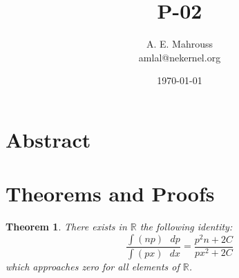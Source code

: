 \documentclass[10pt, twocolumn]{article}
\title{P-02}
\author{A. E. Mahrouss\\amlal@nekernel.org}
\date{\today}
\theoremstyle{plain}
\newtheorem{theorem}{Theorem}[section]
\theoremstyle{definition}
\theoremstyle{remark}
\begin{document}
\maketitle

\section{Abstract}

\section{Theorems and Proofs}
\begin{theorem}
    There exists in $\mathbb{R}$ the following identity:
    \begin{equation}
        \frac{\int (np) \text{ } dp}{\int (px) \text{ } dx} = \frac{p^2n+2C}{px^2+2C}
    \end{equation}
    which approaches zero for all elements of $\mathbb{R}$.
\end{theorem}

\nocite{*}



\end{document}
